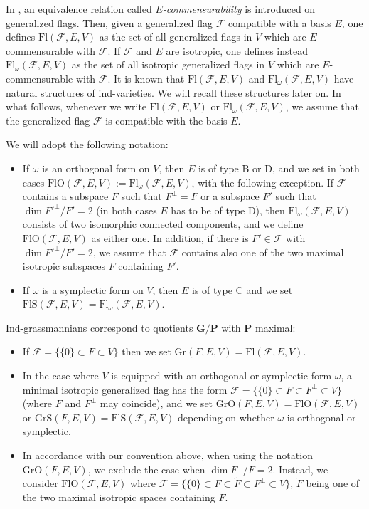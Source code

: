\documentclass[12pt]{amsart}
\newcommand{\Flags}{\mathrm{Fl}}
\newcommand{\Grass}{\mathrm{Gr}}
\newcommand{\OFlags}{\mathrm{FlO}}
\newcommand{\OGrass}{\mathrm{GrO}}
\newcommand{\SFlags}{\mathrm{FlS}}
\newcommand{\SGrass}{\mathrm{GrS}}
\theoremstyle{definition}
\newcommand{\F}{\mathcal{F}}
\begin{document}
In \cite{Dimitrov-Penkov}, an equivalence relation called \emph{$E$-commensurability} is introduced on generalized flags.
Then, given a generalized flag $\mathcal{F}$ compatible with a basis $E$, one defines $\Flags(\mathcal{F},E,V)$ as the set of all generalized flags in $V$ which are $E$-commensurable with $\mathcal{F}$. 
If $\mathcal{F}$ and $E$ are isotropic, one defines instead $\Flags_\omega(\mathcal{F},E,V)$ as the set of all isotropic generalized flags in $V$ which are $E$-commensurable with $\mathcal{F}$.
It is known that 
$\Flags(\mathcal{F},E,V)$ and $\Flags_\omega(\mathcal{F},E,V)$ have natural structures of ind-varieties. We will recall these structures later on. In what follows, whenever we write $\mathrm{Fl}(\mathcal{F},E,V)$ or  $\Flags_\omega(\mathcal{F},E,V)$, we assume that the generalized flag $\mathcal{F}$ is compatible with the basis $E$.

We will adopt the following notation:
\begin{itemize}
\item If $\omega$ is an orthogonal form on $V$, then 
$E$ is of type B or D, and we set in both cases
$\OFlags(\mathcal{F},E,V):=\mathrm{Fl}_\omega(\mathcal{F},E,V)$, with the following exception. If $\mathcal{F}$ contains a subspace $F$ such that $F^\perp=F$ or a subspace $F'$ such that $\dim F'^\perp/F'=2$ (in both cases $E$ has to be of type D), then $\Flags_\omega(\mathcal{F},E,V)$ consists of two isomorphic connected components, and we define $\OFlags(\mathcal{F},E,V)$ as either one. In addition, if there is $F'\in\mathcal{F}$ with $\dim F'^\perp/F'=2$, we assume that $\mathcal{F}$ contains also one of the two maximal isotropic subspaces $F$ containing $F'$.
\item If $\omega$ is a symplectic form on $V$, then $E$ is of type C and we set
$\SFlags(\mathcal{F},E,V)=\mathrm{Fl}_\omega(\mathcal{F},E,V)$.

\end{itemize}

Ind-grassmannians correspond to quotients $\mathbf{G}/\mathbf{P}$ with $\mathbf{P}$ maximal:
\begin{itemize}
\item If $\F=\{\{0\}\subset F\subset V\}$ then we set $\Grass(F,E,V)=\Flags(\F,E,V)$.
\item In the case where $V$ is equipped with an orthogonal
or symplectic form $\omega$, a minimal isotropic generalized flag has the form $\F=\{\{0\}\subset F\subset F^\perp\subset V\}$ (where $F$ and $F^\perp$ may coincide), and we set 
$\OGrass(F,E,V)=\OFlags(\mathcal{F},E,V)$ or $\SGrass(F,E,V)=\SFlags(\mathcal{F},E,V)$
depending on whether $\omega$ is orthogonal or symplectic.
\item In accordance with our convention above, when using the notation $\OGrass(F,E,V)$, we exclude the case when $\dim F^\perp/F=2$. Instead, we consider 
$\OFlags(\mathcal{F},E,V)$ where $\mathcal{F}=\{\{0\}\subset F\subset \tilde{F}\subset F^\perp\subset V\}$, $\tilde{F}$ being one of the two maximal isotropic spaces containing $F$.
\end{itemize}
\end{document}
